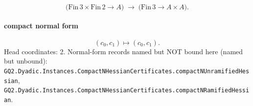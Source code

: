 \[\bigl(\mathrm{Fin}\,3\times\mathrm{Fin}\,2\to A\bigr)\;\longrightarrow\;\bigl(\mathrm{Fin}\,3\to A\times A\bigr).\]
\paragraph{compact normal form}
\[(c_0,c_1)\mapsto(c_0,c_1).\]
Head coordinates: 2. Normal-form records named but NOT bound here (named but unbound): \texttt{GQ2.Dyadic.Instances.CompactNHessianCertificates.compactNUnramifiedHessian}, \texttt{GQ2.Dyadic.Instances.CompactNHessianCertificates.compactNRamifiedHessian}.
